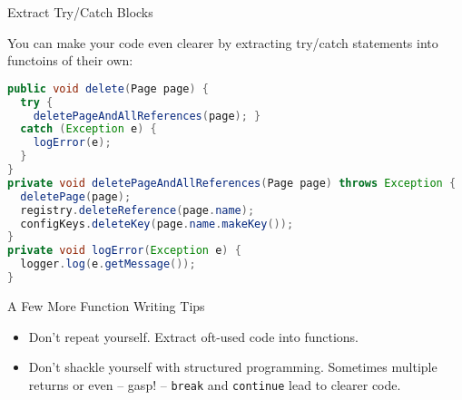 \documentclass{beamer}
\begin{document}
\begin{frame}[fragile]{Extract Try/Catch Blocks}


You can make your code even clearer by extracting try/catch statements into functoins of their own:
\begin{lstlisting}[language=Java]
public void delete(Page page) {
  try {
    deletePageAndAllReferences(page); }
  catch (Exception e) {
    logError(e);
  }
}
private void deletePageAndAllReferences(Page page) throws Exception {
  deletePage(page);
  registry.deleteReference(page.name);
  configKeys.deleteKey(page.name.makeKey());
}
private void logError(Exception e) {
  logger.log(e.getMessage());
}
\end{lstlisting}


\end{frame}

\begin{frame}[fragile]{A Few More Function Writing Tips}


\begin{itemize}
\item Don't repeat yourself.  Extract oft-used code into functions.
\item Don't shackle yourself with structured programming.  Sometimes multiple returns or even -- gasp! -- {\tt break} and {\tt continue} lead to clearer code. 
\end{itemize}



\end{frame}








\end{document}

